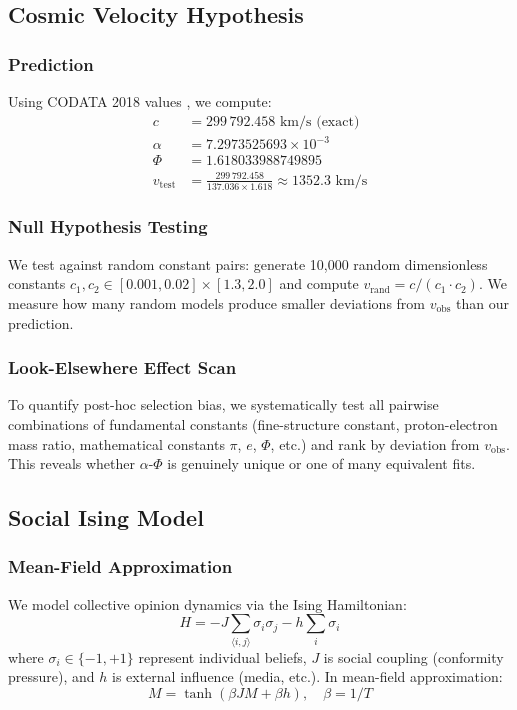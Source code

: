 \documentclass[11pt,twocolumn]{article}
\newcommand{\vtest}{v_{\text{test}}}
\newcommand{\vobs}{v_{\text{obs}}}
\begin{document}
\subsection{Cosmic Velocity Hypothesis}

\subsubsection{Prediction}
Using CODATA 2018 values \cite{codata2018}, we compute:
\begin{align}
c &= 299\,792.458 \text{ km/s (exact)} \\
\alpha &= 7.2973525693 \times 10^{-3} \\
\Phi &= 1.618033988749895 \\
\vtest &= \frac{299\,792.458}{137.036 \times 1.618} \approx 1352.3 \text{ km/s}
\end{align}

\subsubsection{Null Hypothesis Testing}
We test against random constant pairs: generate 10,000 random dimensionless constants $c_1, c_2 \in [0.001, 0.02] \times [1.3, 2.0]$ and compute $v_{\text{rand}} = c/(c_1 \cdot c_2)$. We measure how many random models produce smaller deviations from $\vobs$ than our prediction.

\subsubsection{Look-Elsewhere Effect Scan}
To quantify post-hoc selection bias, we systematically test all pairwise combinations of fundamental constants (fine-structure constant, proton-electron mass ratio, mathematical constants $\pi$, $e$, $\Phi$, etc.) and rank by deviation from $\vobs$. This reveals whether $\alpha$-$\Phi$ is genuinely unique or one of many equivalent fits.

\subsection{Social Ising Model}

\subsubsection{Mean-Field Approximation}
We model collective opinion dynamics via the Ising Hamiltonian:
\begin{equation}
H = -J \sum_{\langle i,j \rangle} \sigma_i \sigma_j - h \sum_i \sigma_i
\end{equation}
where $\sigma_i \in \{-1, +1\}$ represent individual beliefs, $J$ is social coupling (conformity pressure), and $h$ is external influence (media, etc.). In mean-field approximation:
\begin{equation}
M = \tanh(\beta J M + \beta h), \quad \beta = 1/T
\end{equation}
\end{document}
